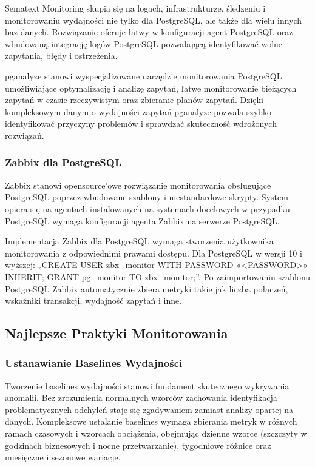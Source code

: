 \documentclass[letterpaper,10pt,polish]{sphinxmanual}
\begin{document}
\sphinxAtStartPar
Sematext Monitoring skupia się na logach, infrastrukturze, śledzeniu i monitorowaniu wydajności nie tylko dla PostgreSQL, ale także dla wielu innych baz danych. Rozwiązanie oferuje łatwy w konfiguracji agent PostgreSQL oraz wbudowaną integrację logów PostgreSQL pozwalającą identyfikować wolne zapytania, błędy i ostrzeżenia.

\sphinxAtStartPar
pganalyze stanowi wyspecjalizowane narzędzie monitorowania PostgreSQL umożliwiające optymalizację i analizę zapytań, łatwe monitorowanie bieżących zapytań w czasie rzeczywistym oraz zbieranie planów zapytań. Dzięki kompleksowym danym o wydajności zapytań pganalyze pozwala szybko identyfikować przyczyny problemów i sprawdzać skuteczność wdrożonych rozwiązań.


\subsubsection{Zabbix dla PostgreSQL}
\label{\detokenize{rozdzial2/repo-wspolne/index:zabbix-dla-postgresql}}
\sphinxAtStartPar
Zabbix stanowi open\sphinxhyphen{}source’owe rozwiązanie monitorowania obsługujące PostgreSQL poprzez wbudowane szablony i niestandardowe skrypty. System opiera się na agentach instalowanych na systemach docelowych \sphinxhyphen{} w przypadku PostgreSQL wymaga konfiguracji agenta Zabbix na serwerze PostgreSQL.

\sphinxAtStartPar
Implementacja Zabbix dla PostgreSQL wymaga stworzenia użytkownika monitorowania z odpowiednimi prawami dostępu. Dla PostgreSQL w wersji 10 i wyższej: „CREATE USER zbx\_monitor WITH PASSWORD «\textless{}PASSWORD\textgreater{}» INHERIT; GRANT pg\_monitor TO zbx\_monitor;”. Po zaimportowaniu szablonu PostgreSQL Zabbix automatycznie zbiera metryki takie jak liczba połączeń, wskaźniki transakcji, wydajność zapytań i inne.


\subsection{Najlepsze Praktyki Monitorowania}
\label{\detokenize{rozdzial2/repo-wspolne/index:najlepsze-praktyki-monitorowania}}

\subsubsection{Ustanawianie Baselines Wydajności}
\label{\detokenize{rozdzial2/repo-wspolne/index:ustanawianie-baselines-wydajnosci}}
\sphinxAtStartPar
Tworzenie baselines wydajności stanowi fundament skutecznego wykrywania anomalii. Bez zrozumienia normalnych wzorców zachowania identyfikacja problematycznych odchyleń staje się zgadywaniem zamiast analizy opartej na danych. Kompleksowe ustalanie baselines wymaga zbierania metryk w różnych ramach czasowych i wzorcach obciążenia, obejmując dzienne wzorce (szczczyty w godzinach biznesowych i nocne przetwarzanie), tygodniowe różnice oraz miesięczne i sezonowe wariacje.
\end{document}
